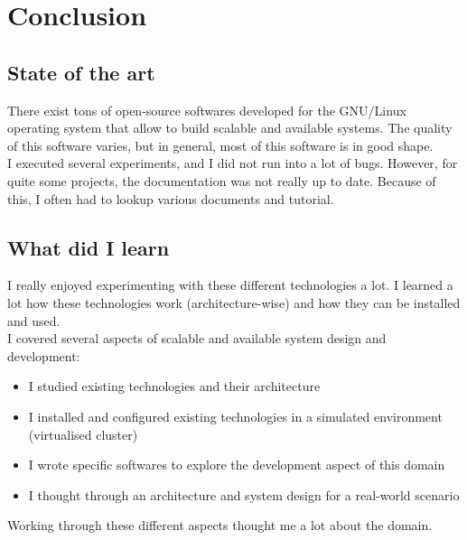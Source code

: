 \documentclass[12pt]{report}
\begin{document}
\chapter{Conclusion} %
\section{State of the art}
There exist tons of open-source softwares developed for the GNU/Linux 
operating system that allow to build scalable and available systems.
The quality of this software varies, but in general, most of this
software is in good shape. \\
I executed several experiments, and I did not run into a lot of
bugs. However, for quite some projects, the documentation was not
really up to date. Because of this, I often had to lookup various
documents and tutorial.\\

\section{What did I learn}
I really enjoyed experimenting with these different technologies a lot. I
learned a lot how these technologies work (architecture-wise) and how
they can be installed and used.\\
I covered several aspects of scalable and available system design and
development: 
\begin{itemize}
\item I studied existing technologies and their architecture
\item I installed and configured existing technologies in a simulated
  environment (virtualised cluster)
\item I wrote specific softwares to explore the development aspect of
  this domain
\item I thought through an architecture and system design for a
  real-world scenario
\end{itemize}
Working through these different aspects thought me a lot about the
domain. 
\end{document}
